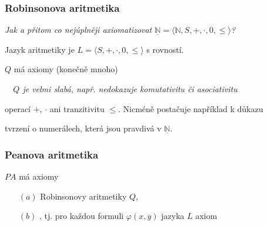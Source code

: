 \subsubsection*{Robinsonova aritmetika}
    {\it Jak  a přitom co nejúplněji axiomatizovat $\underline{\mathbb{N}}=\langle \mathbb{N},S,+,\cdot,0,\le\rangle$?}
    \medskip
    
    Jazyk aritmetiky je $L=\langle S,+,\cdot,0,\le \rangle$ s rovností.
    \medskip
    
     $Q$ má axiomy (konečně mnoho)

    

    {\it {}\ \ $Q$ je velmi slabá, např. nedokazuje komutativitu či asociativitu
    \smallskip
    
    operací $+$, $\cdot$ ani tranzitivitu $\le$. Nicméně postačuje například k důkazu
    \smallskip
    
     tvrzení o numerálech, která jsou pravdivá v $\underline{\mathbb{N}}$.}
    \medskip
    
    
    
    
    
    
    \subsubsection*{Peanova aritmetika}
    
     $PA$ má axiomy
    
    \begin{enumerate}
    \item[$(a)$] Robinsonovy aritmetiky $Q$,
    \smallskip
    
    \item[$(b)$] , tj. pro každou formuli $\varphi(x,\overline{y})$ jazyka $L$ axiom
    
    
    
    \end{enumerate}
    
